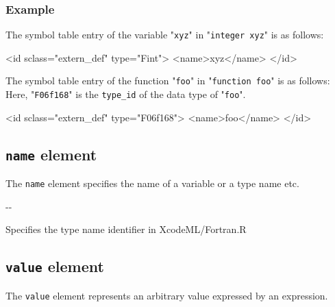 \subsubsection*{Example}

The symbol table entry of the variable "{\tt xyz}" in "{\tt integer xyz}" is as follows:
\vspace{2mm}

\begin{XcodeMLFExample}
<id sclass="extern_def" type="Fint">
  <name>xyz</name>
</id>
\end{XcodeMLFExample}

The symbol table entry of the function "{\tt foo}" in "{\tt function foo}" is as follows:
Here, "{\tt F06f168}" is the {\tt type\_id} of the data type of "{\tt foo}".
\vspace{2mm}

\begin{XcodeMLFExample}
<id sclass="extern_def" type="F06f168">
  <name>foo</name>
</id>
\end{XcodeMLFExample}


\subsection{ {\tt name} element}

The {\tt name} element specifies the name of a variable or a type name etc.


\begin{XcodeMLChildElements}
\XcodeMLElementDef{-}
{-}{-}
\end{XcodeMLChildElements}

\begin{XcodeMLAttributes}
{Specifies the type name identifier in XcodeML/Fortran.}{R}
\end{XcodeMLAttributes}


\subsection{ {\tt value} element}

The {\tt value} element represents an arbitrary value expressed by an expression.



